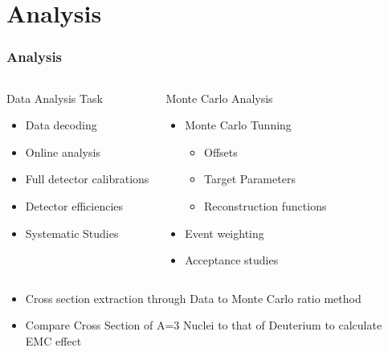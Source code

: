\documentclass{beamer}
\begin{document}
\section[Analysis]{Analysis}

\begin{frame}
\frametitle{Analysis}
	\begin{columns}
	\begin{block}{Data Analysis Task}
		\begin{itemize}
			\item Data decoding 
			\item Online analysis
			\item Full detector calibrations 
			\item Detector efficiencies
			\item Systematic Studies
		\end{itemize}
	\end{block}
	\begin{block}{Monte Carlo Analysis}
		\begin{itemize}
			\item Monte Carlo Tunning
				\begin{itemize}
					\item Offsets
					\item Target Parameters
					\item Reconstruction functions
				\end{itemize}
			\item Event weighting 
			\item Acceptance studies
			
		\end{itemize}
	\end{block}
	\end{columns}
	\begin{block}{}
		\begin{itemize}
			\item Cross section extraction through Data to Monte Carlo ratio method
			\item Compare Cross Section of A=3 Nuclei to that of Deuterium to calculate EMC effect 
		\end{itemize}
	\end{block}
\end{frame}
\end{document}
